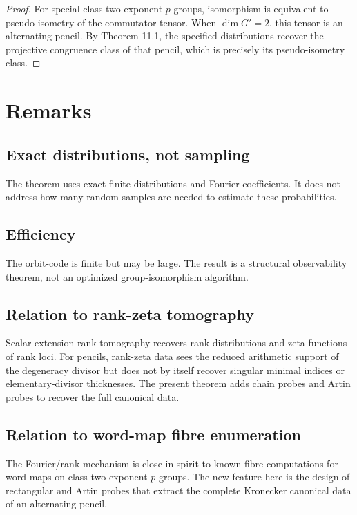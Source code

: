 \documentclass[11pt]{article}
\begin{document}
\begin{proof}

For special class-two exponent-$p$ groups, isomorphism is equivalent to pseudo-isometry of the commutator tensor. When $\dim G'=2$, this tensor is an alternating pencil. By Theorem 11.1, the specified distributions recover the projective congruence class of that pencil, which is precisely its pseudo-isometry class.

\end{proof}

\section{Remarks}

\subsection{Exact distributions, not sampling}

The theorem uses exact finite distributions and Fourier coefficients. It does not address how many random samples are needed to estimate these probabilities.

\subsection{Efficiency}

The orbit-code is finite but may be large. The result is a structural observability theorem, not an optimized group-isomorphism algorithm.

\subsection{Relation to rank-zeta tomography}

Scalar-extension rank tomography recovers rank distributions and zeta functions of rank loci. For pencils, rank-zeta data sees the reduced arithmetic support of the degeneracy divisor but does not by itself recover singular minimal indices or elementary-divisor thicknesses. The present theorem adds chain probes and Artin probes to recover the full canonical data.

\subsection{Relation to word-map fibre enumeration}

The Fourier/rank mechanism is close in spirit to known fibre computations for word maps on class-two exponent-$p$ groups. The new feature here is the design of rectangular and Artin probes that extract the complete Kronecker canonical data of an alternating pencil.
\end{document}
